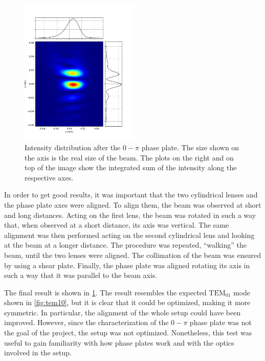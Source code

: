 \begin{figure}
    \centering
    \includegraphics[width=0.5\textwidth]{chapters/chapter_3/figures/0pi_image.pdf}
    \caption{Intensity distribution after the $0-\pi$ phase plate. The size shown on the axis is the real size of the beam. The plots on the right and on top of the image show the integrated sum of the intensity along the respective axes.}
    \label{fig:0pi_image}
\end{figure}


In order to get good results, it was important that the two cylindrical lenses and the phase plate axes were aligned. To align them, the beam was observed at short and long distances. Acting on the first lens, the beam was rotated in such a way that, when observed at a short distance, its axis was vertical. The same alignment was then performed acting on the second cylindrical lens and looking at the beam at a longer distance. The procedure was repeated, \enquote{walking} the beam, until the two lenses were aligned. The collimation of the beam was ensured by using a shear plate. Finally, the phase plate was aligned rotating its axis in such a way that it was parallel to the beam axis.

The final result is shown in \cref{fig:0pi_image}. The result resembles the expected $\text{TEM}_{01}$ mode shown in \cref{fig:tem10}, but it is clear that it could be optimized, making it more symmetric. In particular, the alignment of the whole setup could have been improved.  However, since the characterization of the $0-\pi$ phase plate was not the goal of the project, the setup was not optimized. Nonetheless, this test was useful to gain familiarity with how phase plates work and with the optics involved in the setup.

